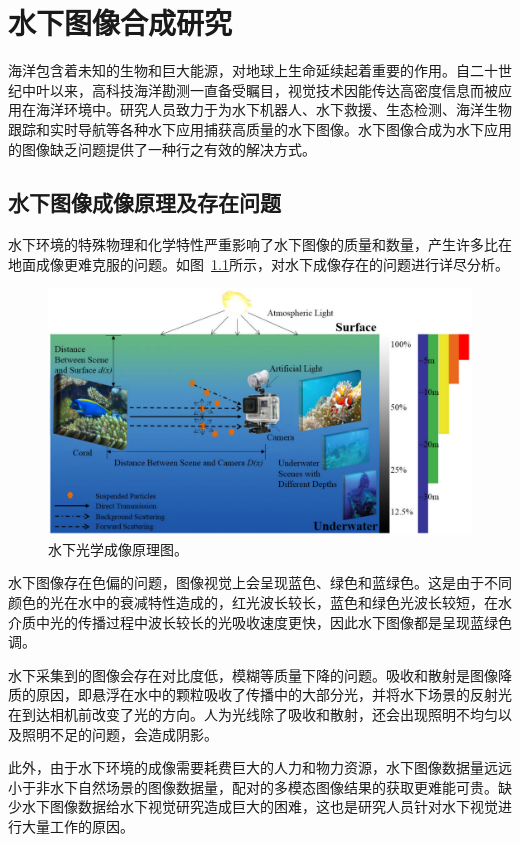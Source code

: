 \chapter{水下图像合成研究}
海洋包含着未知的生物和巨大能源，对地球上生命延续起着重要的作用。自二十世纪中叶以来，高科技海洋勘测一直备受瞩目，视觉技术因能传达高密度信息而被应用在海洋环境中。研究人员致力于为水下机器人、水下救援、生态检测、海洋生物跟踪和实时导航等各种水下应用捕获高质量的水下图像。水下图像合成为水下应用的图像缺乏问题提供了一种行之有效的解决方式。

\section{水下图像成像原理及存在问题}
水下环境的特殊物理和化学特性严重影响了水下图像的质量和数量，产生许多比在地面成像更难克服的问题。如图~\ref{fig:underwater}所示，对水下成像存在的问题进行详尽分析。

\begin{figure}[ht]
    \centering
	\includegraphics[width=\textwidth]{figures/水下成像.pdf}
	\caption{水下光学成像原理图。}
	\label{fig:underwater}
\end{figure}

水下图像存在色偏的问题，图像视觉上会呈现蓝色、绿色和蓝绿色。这是由于不同颜色的光在水中的衰减特性造成的，红光波长较长，蓝色和绿色光波长较短，在水介质中光的传播过程中波长较长的光吸收速度更快，因此水下图像都是呈现蓝绿色调。

水下采集到的图像会存在对比度低，模糊等质量下降的问题。吸收和散射是图像降质的原因，即悬浮在水中的颗粒吸收了传播中的大部分光，并将水下场景的反射光在到达相机前改变了光的方向。人为光线除了吸收和散射，还会出现照明不均匀以及照明不足的问题，会造成阴影。


此外，由于水下环境的成像需要耗费巨大的人力和物力资源，水下图像数据量远远小于非水下自然场景的图像数据量，配对的多模态图像结果的获取更难能可贵。缺少水下图像数据给水下视觉研究造成巨大的困难，这也是研究人员针对水下视觉进行大量工作的原因。

